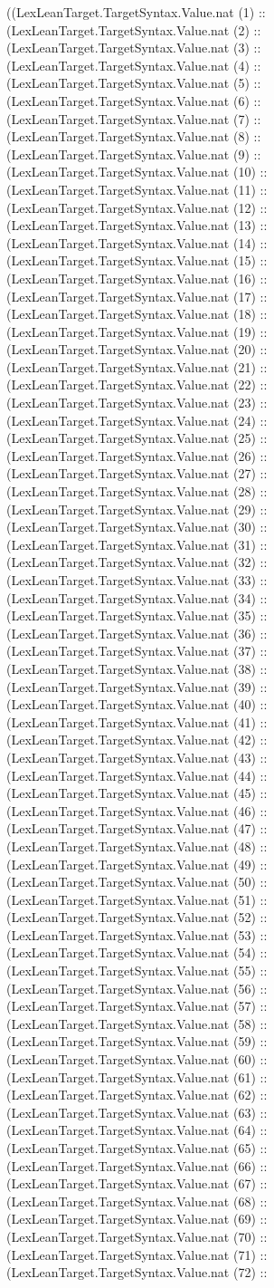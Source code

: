 \documentclass[11pt]{article}
\begin{document}
((LexLeanTarget.TargetSyntax.Value.nat (1) :: (LexLeanTarget.TargetSyntax.Value.nat (2) :: (LexLeanTarget.TargetSyntax.Value.nat (3) :: (LexLeanTarget.TargetSyntax.Value.nat (4) :: (LexLeanTarget.TargetSyntax.Value.nat (5) :: (LexLeanTarget.TargetSyntax.Value.nat (6) :: (LexLeanTarget.TargetSyntax.Value.nat (7) :: (LexLeanTarget.TargetSyntax.Value.nat (8) :: (LexLeanTarget.TargetSyntax.Value.nat (9) :: (LexLeanTarget.TargetSyntax.Value.nat (10) :: (LexLeanTarget.TargetSyntax.Value.nat (11) :: (LexLeanTarget.TargetSyntax.Value.nat (12) :: (LexLeanTarget.TargetSyntax.Value.nat (13) :: (LexLeanTarget.TargetSyntax.Value.nat (14) :: (LexLeanTarget.TargetSyntax.Value.nat (15) :: (LexLeanTarget.TargetSyntax.Value.nat (16) :: (LexLeanTarget.TargetSyntax.Value.nat (17) :: (LexLeanTarget.TargetSyntax.Value.nat (18) :: (LexLeanTarget.TargetSyntax.Value.nat (19) :: (LexLeanTarget.TargetSyntax.Value.nat (20) :: (LexLeanTarget.TargetSyntax.Value.nat (21) :: (LexLeanTarget.TargetSyntax.Value.nat (22) :: (LexLeanTarget.TargetSyntax.Value.nat (23) :: (LexLeanTarget.TargetSyntax.Value.nat (24) :: (LexLeanTarget.TargetSyntax.Value.nat (25) :: (LexLeanTarget.TargetSyntax.Value.nat (26) :: (LexLeanTarget.TargetSyntax.Value.nat (27) :: (LexLeanTarget.TargetSyntax.Value.nat (28) :: (LexLeanTarget.TargetSyntax.Value.nat (29) :: (LexLeanTarget.TargetSyntax.Value.nat (30) :: (LexLeanTarget.TargetSyntax.Value.nat (31) :: (LexLeanTarget.TargetSyntax.Value.nat (32) :: (LexLeanTarget.TargetSyntax.Value.nat (33) :: (LexLeanTarget.TargetSyntax.Value.nat (34) :: (LexLeanTarget.TargetSyntax.Value.nat (35) :: (LexLeanTarget.TargetSyntax.Value.nat (36) :: (LexLeanTarget.TargetSyntax.Value.nat (37) :: (LexLeanTarget.TargetSyntax.Value.nat (38) :: (LexLeanTarget.TargetSyntax.Value.nat (39) :: (LexLeanTarget.TargetSyntax.Value.nat (40) :: (LexLeanTarget.TargetSyntax.Value.nat (41) :: (LexLeanTarget.TargetSyntax.Value.nat (42) :: (LexLeanTarget.TargetSyntax.Value.nat (43) :: (LexLeanTarget.TargetSyntax.Value.nat (44) :: (LexLeanTarget.TargetSyntax.Value.nat (45) :: (LexLeanTarget.TargetSyntax.Value.nat (46) :: (LexLeanTarget.TargetSyntax.Value.nat (47) :: (LexLeanTarget.TargetSyntax.Value.nat (48) :: (LexLeanTarget.TargetSyntax.Value.nat (49) :: (LexLeanTarget.TargetSyntax.Value.nat (50) :: (LexLeanTarget.TargetSyntax.Value.nat (51) :: (LexLeanTarget.TargetSyntax.Value.nat (52) :: (LexLeanTarget.TargetSyntax.Value.nat (53) :: (LexLeanTarget.TargetSyntax.Value.nat (54) :: (LexLeanTarget.TargetSyntax.Value.nat (55) :: (LexLeanTarget.TargetSyntax.Value.nat (56) :: (LexLeanTarget.TargetSyntax.Value.nat (57) :: (LexLeanTarget.TargetSyntax.Value.nat (58) :: (LexLeanTarget.TargetSyntax.Value.nat (59) :: (LexLeanTarget.TargetSyntax.Value.nat (60) :: (LexLeanTarget.TargetSyntax.Value.nat (61) :: (LexLeanTarget.TargetSyntax.Value.nat (62) :: (LexLeanTarget.TargetSyntax.Value.nat (63) :: (LexLeanTarget.TargetSyntax.Value.nat (64) :: (LexLeanTarget.TargetSyntax.Value.nat (65) :: (LexLeanTarget.TargetSyntax.Value.nat (66) :: (LexLeanTarget.TargetSyntax.Value.nat (67) :: (LexLeanTarget.TargetSyntax.Value.nat (68) :: (LexLeanTarget.TargetSyntax.Value.nat (69) :: (LexLeanTarget.TargetSyntax.Value.nat (70) :: (LexLeanTarget.TargetSyntax.Value.nat (71) :: (LexLeanTarget.TargetSyntax.Value.nat (72) :: 
\end{document}
